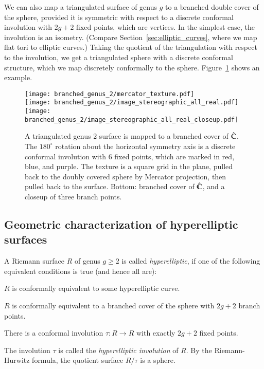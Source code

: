 \documentclass[Thesis]{subfiles}
\begin{document}
 We
can also map a triangulated surface of genus $g$ to a branched double
cover of the sphere, provided it is symmetric with respect to a
discrete conformal involution with $2g+2$ fixed points, which are
vertices. In the simplest case, the involution is an
isometry. (Compare Section~\ref{sec:elliptic_curves}, where we map
flat tori to elliptic curves.) Taking the quotient of the triangulation
with respect to the involution, we get a triangulated sphere with a
discrete conformal structure, which we map discretely conformally to
the sphere.  Figure~\ref{fig:genus2_branched} shows an example.
\begin{figure} 
\centering
\texttt{[image: branched\_genus\_2/mercator\_texture.pdf]}\\
\texttt{[image: branched\_genus\_2/image\_stereographic\_all\_real.pdf]}%
\quad%
\texttt{[image: branched\_genus\_2/image\_stereographic\_all\_real\_closeup.pdf]}
\caption{A triangulated genus $2$ surface is mapped to a branched
  cover of $\hat{\mathbb C}$. The $180^{\circ}$ rotation about the horizontal
  symmetry axis is a discrete conformal involution with $6$ fixed
  points, which are marked in red, blue, and purple. The texture is a
  square grid in the plane, pulled back to the doubly covered sphere
  by Mercator projection, then pulled back to the surface. Bottom:
  branched cover of $\hat{\mathbb C}$, and a closeup of three branch points.}
\label{fig:genus2_branched} 
\end{figure}

\subsection{Geometric characterization of hyperelliptic surfaces}
\label{sec:hyperelliptic_domain}

A Riemann surface $R$ of genus $g\geq 2$ is called \emph{hyperelliptic},
if one of the following equivalent conditions is true (and hence all are):
\begin{compactenum}[(i)]
\item $R$ is conformally equivalent to some hyperelliptic curve.
\item $R$ is conformally equivalent to a branched cover of the sphere
  with $2g+2$ branch points.
\item There is a conformal involution $\tau:R\rightarrow R$ with
  exactly $2g+2$ fixed points. 
\end{compactenum}
The involution $\tau$ is called the \emph{hyperelliptic involution} of
$R$. By the Riemann-Hurwitz formula, the quotient surface $R/\tau$ is a
sphere. 
\end{document}
